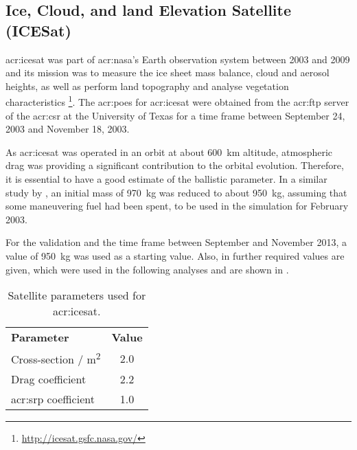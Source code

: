 \subsection{Ice, Cloud, and land Elevation Satellite (ICESat)}

\gls{acr:icesat} was part of \acrshort{acr:nasa}'s Earth observation system between 2003 and 2009 and its mission was to measure the ice sheet mass balance, cloud 
and aerosol heights, as well as perform land topography and analyse vegetation characteristics \footnote{\url{http://icesat.gsfc.nasa.gov/}}. The 
\gls{acr:poe}s for \gls{acr:icesat} were obtained from the \acrshort{acr:ftp} server of the \gls{acr:csr} at the University of Texas \citep{csr2014} for a time frame between September 24, 2003 and November 18, 2003.

As \gls{acr:icesat} was operated in an orbit at about \SI{600}{\kilo\metre} altitude, atmospheric drag was providing a significant contribution to the orbital evolution. 
Therefore, it is essential to have a good estimate of the ballistic parameter. In a similar study by \cite{vallado2007}, an initial mass of \SI{970}{\kilogram} was reduced to about \SI{950}{\kilogram}, assuming that some maneuvering fuel had been spent, to be used in the simulation for February 2003.

For the \neptune{} validation and the time frame between September and November 2013, a value of \SI{950}{\kilogram} was used as a starting value. Also, in 
\cite{vallado2007} further required values are given, which were used in the following analyses and are shown in .
\begin{table}[h!]
 \centering
 \caption{Satellite parameters used for \gls{acr:icesat}.\label{tab:val-ice-data}}
 \begin{tabular}{lS}
 \toprule
	\textbf{Parameter} & \textbf{Value} \\
  Cross-section / \si{\metre\squared}   & 2.0 \\
  Drag coefficient          & 2.2 \\
  \acrshort{acr:srp} coefficient & 1.0 \\
  \bottomrule
 \end{tabular}
\end{table}

